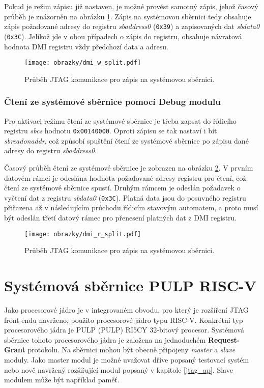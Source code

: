 Pokud je režim zápisu již nastaven, je možné provést samotný zápis, jehož časový průběh je znázorněn na obrázku \ref{fig:dmi_w}. Zápis na systémovou sběrnici tedy obsahuje zápis požadované adresy do registru \textit{sbaddress0} (\texttt{0x39}) a zapisovaných dat \textit{sbdata0} (\texttt{0x3C}). Jelikož jde v obou případech o zápis do registru, obsahuje návratová hodnota \acs{DMI} registru vždy předchozí data a adresu.
 
\begin{figure}[!h]
  \begin{center}
    \texttt{[image: obrazky/dmi\_w\_split.pdf]}
  \end{center}
  \caption{Průběh \acs{JTAG} komunikace pro zápis na systémovou sběrnici.}
	\label{fig:dmi_w}
\end{figure}

\subsubsection{Čtení ze systémové sběrnice pomocí Debug modulu}
Pro aktivaci režimu čtení ze systémové sběrnice je třeba zapsat do řídicího registru \textit{sbcs} hodnotu \texttt{0x00140000}. Oproti zápisu se tak nastaví i bit \textit{sbreadonaddr}, což způsobí spuštění čtení ze systémové sběrnice po zápisu dané adresy do registru \textit{sbaddress0}.

Časový průběh čtení ze systémové sběrnice je zobrazen na obrázku \ref{fig:dmi_r}. V prvním datovém rámci je odeslána hodnota požadované adresy registru pro čtení, což čtení ze systémové sběrnice spustí. Druhým rámcem je odeslán požadavek o vyčtení dat z registru \textit{sbdata0} (\texttt{0x3C}). Platná data jsou do posuvného registru přiřazena až v následujícím průchodu řídicím stavovým automatem, a proto musí být odeslán třetí datový rámec pro přenesení platných dat z \acs{DMI} registru.

\begin{figure}[!h]
  \begin{center}
    \texttt{[image: obrazky/dmi\_r\_split.pdf]}
  \end{center}
  \caption{Průběh \acs{JTAG} komunikace pro zápis na systémovou sběrnici.}
	\label{fig:dmi_r}
\end{figure}

\section{Systémová sběrnice PULP RISC-V}
Jako procesorové jádro je v integrovaném obvodu, pro který je rozšíření JTAG front-endu navrženo, použito procesorové jádro typu \acs{RISC-V}. Konkrétní typ procesorového jádra je \acs{PULP} (\acl{PULP}) RI5CY 32-bitový procesor. Systémová sběrnice tohoto procesorového jádra je založena na jednoduchém \textbf{Request-Grant} protokolu. Na sběrnici mohou být obecně připojeny \textit{master} a \textit{slave} moduly. Jako master modul je možné uvažovat dříve popsaný testovací systém nebo nově navržený rozšiřující modul popsaný v kapitole \ref{jtag_ap}. Slave modulem může být například paměť.

